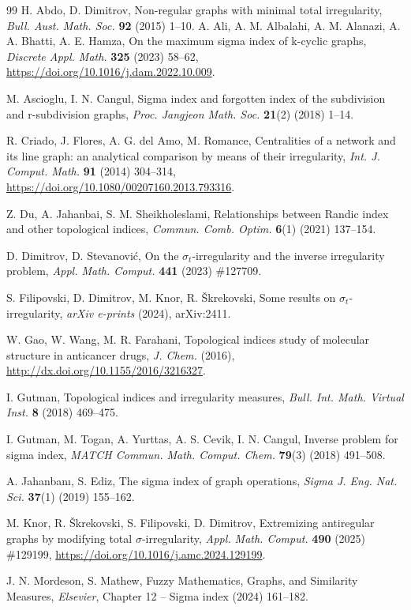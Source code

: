 \documentclass[12pt]{amsart}
\begin{document}
\begin{thebibliography}{99}
 H. Abdo, D. Dimitrov, Non-regular graphs with minimal total irregularity, {\em Bull. Aust. Math. Soc.} \textbf{92} (2015) 1--10.
 A. Ali, A. M. Albalahi, A. M. Alanazi, A. A. Bhatti,
A. E. Hamza, On the maximum sigma index of k-cyclic graphs,
{\em Discrete Appl. Math.} \textbf{325} (2023) 58--62,
\url{https://doi.org/10.1016/j.dam.2022.10.009}.

 M. Ascioglu, I. N. Cangul, Sigma index and forgotten
index of the subdivision and r-subdivision graphs,
{\em Proc. Jangjeon Math. Soc.} \textbf{21}(2) (2018) 1--14.

 R. Criado, J. Flores, A. G. del Amo, M. Romance,
Centralities of a network and its line graph: an analytical comparison by
means of their irregularity, {\em Int. J. Comput. Math.} \textbf{91} (2014)
304--314, \url{https://doi.org/10.1080/00207160.2013.793316}.

 Z. Du, A. Jahanbai, S. M. Sheikholeslami,
Relationships between Randic index and other topological indices,
{\em Commun. Comb. Optim.} \textbf{6}(1) (2021) 137--154.

 D. Dimitrov, D. Stevanović, On the
$\sigma_t$-irregularity and the inverse irregularity problem,
{\em Appl. Math. Comput.} \textbf{441} (2023) \#127709.

 S. Filipovski, D. Dimitrov, M. Knor, R. Škrekovski,
Some results on $\sigma_t$-irregularity, {\em arXiv e-prints} (2024),
arXiv:2411.

 W. Gao, W. Wang, M. R. Farahani, Topological indices study
of molecular structure in anticancer drugs, {\em J. Chem.} (2016),
\url{http://dx.doi.org/10.1155/2016/3216327}.

 I. Gutman, Topological indices and irregularity measures,
{\em Bull. Int. Math. Virtual Inst.} \textbf{8} (2018) 469--475.

 I. Gutman, M. Togan, A. Yurttas, A. S. Cevik, I. N. Cangul,
Inverse problem for sigma index, {\em MATCH Commun. Math. Comput. Chem.}
\textbf{79}(3) (2018) 491--508.

 A. Jahanbanı, S. Ediz, The sigma index of graph operations,
{\em Sigma J. Eng. Nat. Sci.} \textbf{37}(1) (2019) 155--162.

 M. Knor, R. Škrekovski, S. Filipovski, D. Dimitrov,
Extremizing antiregular graphs by modifying total $\sigma$-irregularity,
{\em Appl. Math. Comput.} \textbf{490} (2025) \#129199,
\url{https://doi.org/10.1016/j.amc.2024.129199}.

 J. N. Mordeson, S. Mathew, Fuzzy Mathematics, Graphs,
and Similarity Measures, {\em Elsevier}, Chapter 12 – Sigma index (2024)
161--182.

\end{thebibliography}
 
\end{document}
